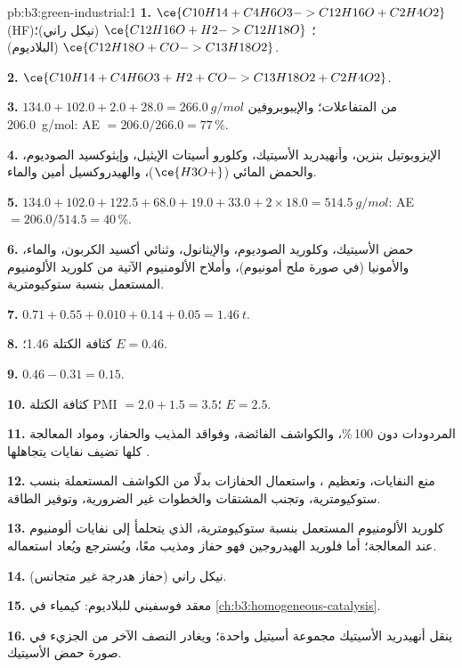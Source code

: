 \begin{solution}{pb:b3:green-industrial:1}
\textbf{1.} $\ce{C10H14 + C4H6O3 -> C12H16O + C2H4O2}$ (HF)؛ $\ce{C12H16O + H2 -> C12H18O}$ (نيكل راني)؛
$\ce{C12H18O + CO -> C13H18O2}$ (البلاديوم).

\textbf{2.} $\ce{C10H14 + C4H6O3 + H2 + CO -> C13H18O2 + C2H4O2}$.

\textbf{3.} $134.0 + 102.0 + 2.0 + 28.0 = \qty{266.0}{g/mol}$ من المتفاعلات؛ والإيبوبروفين \qty{206.0}{g/mol}: AE $= 206.0/266.0 = 77$\,\%.

\textbf{4.} الإيزوبوتيل بنزين، وأنهيدريد الأسيتيك، وكلورو أسيتات الإيثيل، وإيثوكسيد الصوديوم،
والحمض المائي ($\ce{H3O+}$)، والهيدروكسيل أمين والماء.

\textbf{5.} $134.0 + 102.0 + 122.5 + 68.0 + 19.0 + 33.0 + 2 \times 18.0 = \qty{514.5}{g/mol}$: AE $= 206.0/514.5 = 40$\,\%.

\textbf{6.} حمض الأسيتيك، وكلوريد الصوديوم، والإيثانول، وثنائي أكسيد الكربون، والماء، والأمونيا (في صورة
ملح أمونيوم)، وأملاح الألومنيوم الآتية من كلوريد الألومنيوم المستعمل بنسبة ستوكيومترية.

\textbf{7.} $0.71 + 0.55 + 0.010 + 0.14 + 0.05 = \qty{1.46}{t}$.

\textbf{8.} كثافة الكتلة 1.46؛ $E = 0.46$.

\textbf{9.} $0.46 - 0.31 = 0.15$.

\textbf{10.} كثافة الكتلة PMI $= 2.0 + 1.5 = 3.5$؛ $E = 2.5$.

\textbf{11.} المردودات دون 100\,\%، والكواشف الفائضة، وفواقد المذيب والحفاز، 
ومواد المعالجة كلها تضيف نفايات يتجاهلها .

\textbf{12.} منع النفايات، وتعظيم ، واستعمال الحفازات بدلًا من
الكواشف المستعملة بنسب ستوكيومترية، وتجنب المشتقات والخطوات غير الضرورية، وتوفير الطاقة.

\textbf{13.} كلوريد الألومنيوم المستعمل بنسبة ستوكيومترية، الذي يتحلمأ إلى نفايات ألومنيوم عند
المعالجة؛ أما فلوريد الهيدروجين فهو حفاز ومذيب معًا، ويُسترجع ويُعاد استعماله.

\textbf{14.} نيكل راني (حفاز هدرجة غير متجانس).

\textbf{15.} معقد فوسفيني للبلاديوم: كيمياء  في
\cref{ch:b3:homogeneous-catalysis}.

\textbf{16.} ينقل أنهيدريد الأسيتيك مجموعة أسيتيل واحدة؛ ويغادر النصف الآخر من
الجزيء في صورة حمض الأسيتيك.


\end{solution}
